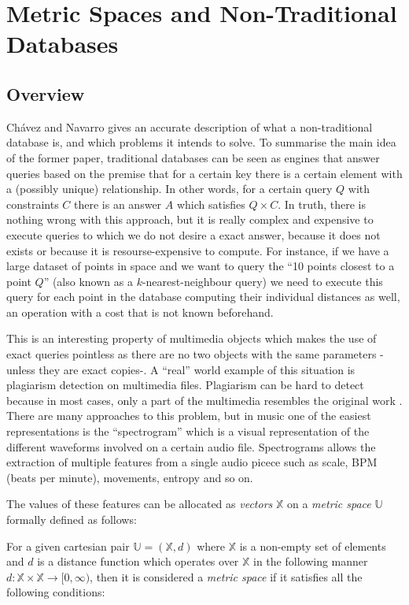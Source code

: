 \section{Metric Spaces and Non-Traditional Databases}
\subsection{Overview}
Chávez and Navarro \cite{chavez2005metric} gives an accurate description of what a non-traditional database
is, and which problems it intends to solve. To summarise the main idea of the former paper, traditional databases
can be seen as engines that answer queries based on the premise that for a certain key there is a certain element
with a (possibly unique) relationship. In other words, for a certain query $Q$ with constraints $C$ there is an answer
$A$ which satisfies $Q \times C$. In truth, there is nothing wrong with this approach, but it is really complex and
expensive to execute queries to which we do not desire a exact answer, because it does not exists or because it is
resourse-expensive to compute. For instance, if we have a large dataset of points in space and we want to query 
the ``10 points closest to a point $Q$'' (also known as a $k$-nearest-neighbour query) we need to 
execute this query for each point in the database computing their individual distances as well, an operation with a cost
that is not known beforehand.

This is an interesting property of multimedia objects which makes the use of exact queries pointless as there are
no two objects with the same parameters -unless they are exact copies-. A ``real'' world example of this situation is plagiarism
detection on multimedia files. Plagiarism\cite{dictionary_plagiarism}
can be hard to detect because in most cases, only a part of the multimedia resembles the original work \cite{citation_needed}.
There are many approaches to this problem, but in music one of the easiest representations is the ``spectrogram''\cite{citation_needed}
which is a visual representation of the different waveforms involved on a certain audio file. Spectrograms allows the extraction of
multiple features from a single audio picece such as scale, BPM (beats per minute), movements, entropy and so on.


The values of these features can be allocated as \emph{vectors} $\mathbb{X}$ on a \emph{metric space} $\mathbb{U}$ formally defined as follows:

For a given cartesian pair $\mathbb{U} = (\mathbb{X}, d)$ where $\mathbb{X}$ is a non-empty set of elements and $d$ is a distance function which
operates over $\mathbb{X}$ in the following manner $d: \mathbb{X}\times\mathbb{X}\rightarrow[0,\infty)$, then it is considered a \emph{metric space}
if it satisfies all the following conditions:

